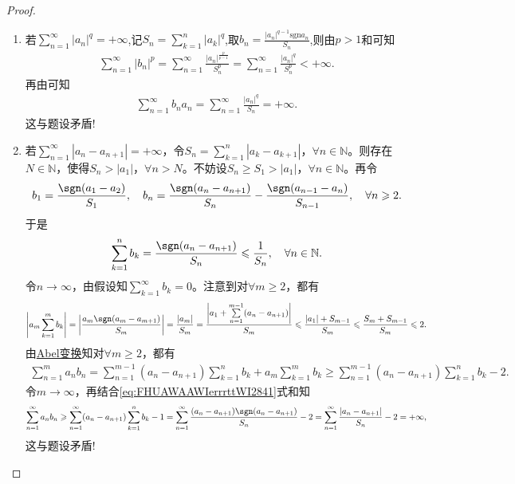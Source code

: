 \documentclass[../../main.tex]{subfiles}%
\begin{document}
\begin{proof}
\begin{enumerate}[(1)]
\item 若$\sum_{n=1}^{\infty}{| a_n |^q}=+\infty$,记$S_n=\sum_{k=1}^n{| a_k |^q}$,取$b_n=\frac{| a_n |^{q-1}\mathrm{sgn} a_n}{S_n}$,则由$p>1$和可知
\begin{align*}
\sum_{n=1}^{\infty}{| b_n |^p}=\sum_{n=1}^{\infty}{\frac{| a_n |^{\frac{p}{p-1}}}{S_{n}^{p}}}=\sum_{n=1}^{\infty}{\frac{| a_n |^q}{S_{n}^{p}}}<+\infty.
\end{align*}
再由可知
\begin{align*}
\sum_{n=1}^{\infty}{b_n a_n}=\sum_{n=1}^{\infty}{\frac{| a_n |^q}{S_n}}=+\infty.
\end{align*}
这与题设矛盾!

\item 若$\sum\limits_{n=1}^{\infty} |a_n - a_{n+1}| = +\infty$，令$S_n = \sum\limits_{k=1}^{n} |a_k - a_{k+1}|$，$\forall n\in \mathbb{N}$。则存在$N\in \mathbb{N}$，使得$S_n > |a_1|$，$\forall n > N$。不妨设$S_n \geqslant S_1 > |a_1|$，$\forall n\in \mathbb{N}$。再令
\begin{align*}
b_1 = \frac{\sgn (a_1 - a_2)}{S_1},\quad b_n = \frac{\sgn (a_n - a_{n+1})}{S_n} - \frac{\sgn (a_{n-1} - a_n)}{S_{n-1}},\quad \forall n\geqslant 2.
\end{align*}
于是
\begin{align*}
\sum\limits_{k=1}^{n} b_k = \frac{\sgn (a_n - a_{n+1})}{S_n} \leqslant \frac{1}{S_n},\quad \forall n\in \mathbb{N}.
\end{align*}
令$n\to\infty$，由假设知$\sum\limits_{k=1}^{\infty} b_k = 0$。注意到对$\forall m\geqslant 2$，都有
\begin{align}
\left| a_m \sum\limits_{k=1}^{m} b_k \right| = \left| \frac{a_m \sgn (a_m - a_{m+1})}{S_m} \right| = \frac{|a_m|}{S_m} = \frac{\left| a_1 + \sum\limits_{n=1}^{m-1} (a_n - a_{n+1}) \right|}{S_m} \leqslant \frac{|a_1| + S_{m-1}}{S_m} \leqslant\frac{S_m + S_{m-1}}{S_m}  \leqslant 2.
\label{eq:FHUAWAAWIerrrttWI2841}
\end{align}
由\hyperref[theorem:Abel变换]{Abel变换}知对$\forall m\geqslant 2$，都有
\begin{align*}
\sum\limits_{n=1}^{m} a_n b_n = \sum\limits_{n=1}^{m-1} (a_n - a_{n+1}) \sum\limits_{k=1}^{n} b_k + a_m \sum\limits_{k=1}^{m} b_k \geqslant \sum\limits_{n=1}^{m-1} (a_n - a_{n+1}) \sum\limits_{k=1}^{n} b_k - 2.
\end{align*}
令$m\to\infty$，再结合\eqref{eq:FHUAWAAWIerrrttWI2841}式和知
\begin{align*}
\sum\limits_{n=1}^{\infty} a_n b_n \geqslant \sum\limits_{n=1}^{\infty} (a_n - a_{n+1}) \sum\limits_{k=1}^{n} b_k - 1 = \sum\limits_{n=1}^{\infty} \frac{(a_n - a_{n+1}) \sgn (a_n - a_{n+1})}{S_n} - 2 = \sum\limits_{n=1}^{\infty} \frac{|a_n - a_{n+1}|}{S_n} - 2 = +\infty,
\end{align*}
这与题设矛盾!
\end{enumerate}
\end{proof}
\end{document}
